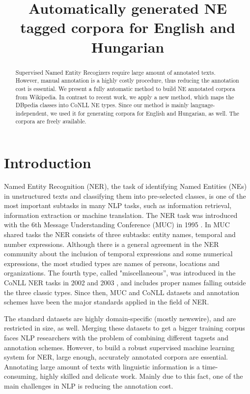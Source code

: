 \documentclass[11pt]{article}
\title{Automatically generated NE tagged corpora for English and Hungarian}
\date{}
\begin{document}
\maketitle
\begin{abstract}

Supervised Named Entity Recogizers require large amount of annotated texts. However, manual annotation is a highly costly procedure, thus reducing the annotation cost is essential. We present a fully automatic method to build NE annotated corpora from Wikipedia. In contrast to recent work, we apply a new method, which maps the DBpedia classes into CoNLL NE types. Since our method is mainly language-independent, we used it for generating corpora for English and Hungarian, as well. The corpora are freely available. 

\end{abstract}

\section{Introduction}
\label{sec:intro}

Named Entity Recognition (NER), the task of identifying Named Entities (NEs) in unstructured texts and classifying them into pre-selected classes, is one of the most important subtasks in many NLP tasks, such as information retrieval, information extraction or machine translation. The NER task was introduced with the 6th Message Understanding Conference (MUC) in 1995 \cite{Grishman:96}. In MUC shared tasks the NER consists of three subtasks: entity names, temporal and number expressions. Although there is a general agreement in the NER community about the inclusion of temporal expressions and some numerical expressions, the most studied types are names of persons, locations and organizations. The fourth type, called "miscellaneous'', was introduced in the CoNLL NER tasks in 2002 \cite{Tjong:02} and 2003 \cite{Tjong:03}, and includes proper names falling outside the three classic types. Since then, MUC and CoNLL datasets and annotation schemes have been the major standards applied in the field of NER. 

The standard datasets are highly domain-specific (mostly newswire), and are restricted in size, as well. 
Merging these datasets to get a bigger training corpus faces NLP researchers with the problem of combining different tagsets and annotation schemes. However, to build a robust supervised machine learning system for NER, large enough, accurately annotated corpora are essential. Annotating large amount of texts with linguistic information is a time-consuming, highly skilled and delicate work. Mainly due to this fact, one of the main challenges in NLP is reducing the annotation cost. 
\end{document}
